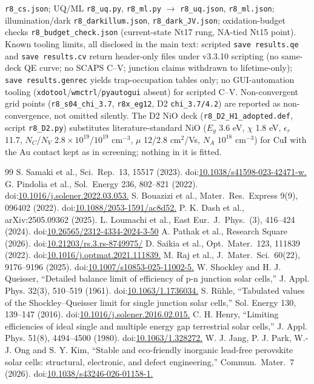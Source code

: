 \documentclass[11pt]{article}
\begin{document}
\texttt{r8\_cs.json}; UQ/ML \texttt{r8\_uq.py}, \texttt{r8\_ml.py} $\rightarrow$ \texttt{r8\_uq.json}, \texttt{r8\_ml.json}; illumination/dark \texttt{r8\_darkillum.json}, \texttt{r8\_dark\_JV.json}; oxidation-budget checks \texttt{r8\_budget\_check.json} (current-state Nt17 rung, NA-tied Nt15 point). Known tooling limits, all disclosed in the main text: scripted \texttt{save results.qe} and \texttt{save results.cv} return header-only files under v3.3.10 scripting (no same-deck QE curve; no SCAPS C--V; junction claims withdrawn to lifetime-only); \texttt{save results.genrec} yields trap-occupation tables only; no GUI-automation tooling (\texttt{xdotool}/\texttt{wmctrl}/\texttt{pyautogui} absent) for scripted C--V. Non-convergent grid points (\texttt{r8\_s04\_chi\_3.7}, \texttt{r8x\_eg12}, D2 \texttt{chi\_3.7/4.2}) are reported as non-convergence, not omitted silently. The D2 NiO deck (\texttt{r8\_D2\_H1\_adopted.def}, script \texttt{r8\_D2.py}) substitutes literature-standard NiO ($E_{g}$ 3.6 eV, $\chi$ 1.8 eV, $\epsilon_{r}$ 11.7, $N_{C}$/$N_{V}$ $2.8\times10^{19}$/$10^{19}$ cm$^{-3}$, $\mu$ 12/2.8 cm$^{2}$/Vs, $N_{A}$ $10^{18}$ cm$^{-3}$) for CuI with the Au contact kept as in screening; nothing in it is fitted.

\begin{thebibliography}{99}
 S. Samaki et al., Sci.\ Rep.\ 13, 15517 (2023). doi:\url{10.1038/s41598-023-42471-w.}
 G. Pindolia et al., Sol.\ Energy 236, 802--821 (2022). doi:\url{10.1016/j.solener.2022.03.053.}
 S. Bouazizi et al., Mater.\ Res.\ Express 9(9), 096402 (2022). doi:\url{10.1088/2053-1591/ac8d52.}
 P. K. Dash et al., arXiv:2505.09362 (2025).
 L. Loumachi et al., East Eur.\ J.\ Phys.\ (3), 416--424 (2024). doi:\url{10.26565/2312-4334-2024-3-50}
 A. Pathak et al., Research Square (2026). doi:\url{10.21203/rs.3.rs-8749975/}
 D. Saikia et al., Opt.\ Mater.\ 123, 111839 (2022). doi:\url{10.1016/j.optmat.2021.111839.}
 M. Raj et al., J.\ Mater.\ Sci.\ 60(22), 9176--9196 (2025). doi:\url{10.1007/s10853-025-11002-5.}
 W. Shockley and H. J. Queisser, ``Detailed balance limit of efficiency of p-n junction solar cells,'' J. Appl. Phys. 32(3), 510--519 (1961). doi:\url{10.1063/1.1736034.}
 S. Rühle, ``Tabulated values of the Shockley--Queisser limit for single junction solar cells,'' Sol. Energy 130, 139--147 (2016). doi:\url{10.1016/j.solener.2016.02.015.}
 C. H. Henry, ``Limiting efficiencies of ideal single and multiple energy gap terrestrial solar cells,'' J. Appl. Phys. 51(8), 4494--4500 (1980). doi:\url{10.1063/1.328272.}
 W. J. Jang, P. J. Park, W.-J. Ong and S. Y. Kim, ``Stable and eco-friendly inorganic lead-free perovskite solar cells: structural, electronic, and defect engineering,'' Commun.\ Mater.\ 7 (2026). doi:\url{10.1038/s43246-026-01158-1.}
\end{thebibliography}
\end{document}
